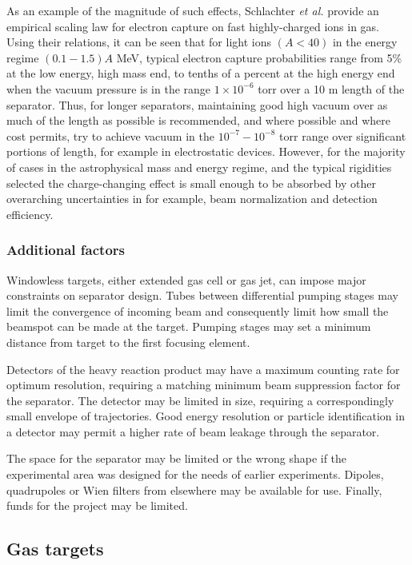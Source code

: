 As an example of the magnitude of such effects, Schlachter {\em et al.} \cite{sch83} provide an empirical scaling law for electron capture on fast highly-charged ions in gas. Using their relations, it can be seen that for light ions $(A<40)$ in the energy regime $(0.1-1.5)A$ MeV, typical electron capture probabilities range from 5\% at the low energy, high mass end, to tenths of a percent at the high energy end when the vacuum pressure is in the range $1\times10^{-6}$ torr over a 10 m length of the separator. Thus, for longer separators, maintaining good high vacuum over as much of the length as possible is recommended, and where possible and where cost permits, try to achieve vacuum in the $10^{-7}-10^{-8}$ torr range over significant portions of length, for example in electrostatic devices. However, for the majority of cases in the astrophysical mass and energy regime, and the typical rigidities selected the charge-changing effect is small enough to be absorbed by other overarching uncertainties in for example, beam normalization and detection efficiency. 



\subsubsection{Additional factors} 
 Windowless targets, either extended gas cell or gas jet, can impose major constraints on separator design.  Tubes between differential pumping stages may limit the convergence of incoming beam and consequently limit how small the beamspot  can be made at the target.  Pumping stages may set a minimum distance from target to the first focusing element.

Detectors of the heavy reaction product may have a maximum counting rate for optimum resolution, requiring a matching minimum beam suppression factor for the separator.   The detector may be limited in size, requiring a correspondingly small envelope of trajectories.    Good energy resolution or particle identification in a detector may permit a higher rate of beam leakage through the separator.

 The space   for the separator may be limited or the wrong shape if the experimental area was designed for the needs of earlier experiments.   Dipoles, quadrupoles  or Wien filters from elsewhere  may be available for use.  Finally,  funds for the project may be limited.   

\subsection{Gas targets}
\label{gas}


